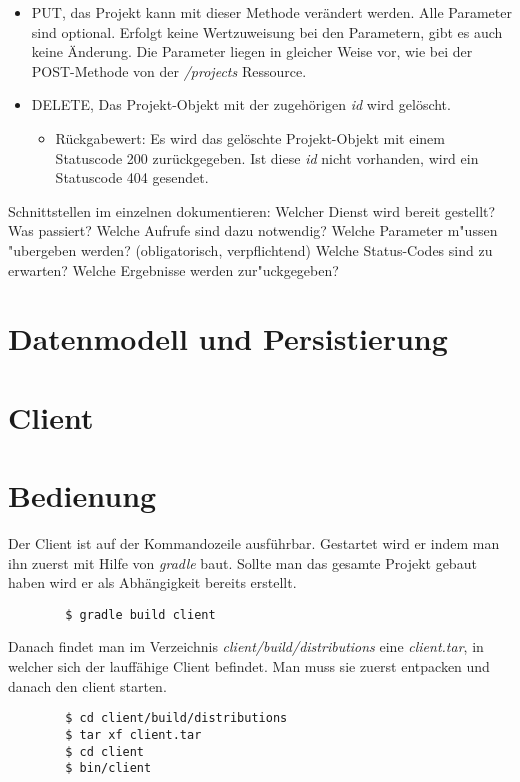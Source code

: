 \documentclass[12pt]{scrartcl}
\begin{document}
\begin{itemize}
\begin{itemize}
\begin{itemize}
				\end{itemize}
				\item PUT, das Projekt kann mit dieser Methode verändert werden. Alle Parameter sind optional. Erfolgt keine Wertzuweisung bei den Parametern, gibt es auch keine Änderung. Die Parameter liegen in gleicher Weise vor, wie bei der POST-Methode von der \emph{/projects} Ressource.
				\item DELETE, Das Projekt-Objekt mit der zugehörigen \emph{id} wird gelöscht.
				\begin{itemize}
					\item Rückgabewert: Es wird das gelöschte Projekt-Objekt mit einem Statuscode 200 zurückgegeben. Ist diese \emph{id} nicht vorhanden, wird ein Statuscode 404 gesendet.
				\end{itemize}
				

	\end{itemize}
\end{itemize}
 Schnittstellen im einzelnen dokumentieren:
 Welcher Dienst wird bereit gestellt? Was passiert?
 Welche Aufrufe sind dazu notwendig?
 Welche Parameter m"ussen "ubergeben werden? (obligatorisch, verpflichtend)
 Welche Status-Codes sind zu erwarten?
 Welche Ergebnisse werden zur"uckgegeben? 
\section{Datenmodell und Persistierung}
\section{Client}

\section{Bedienung}

	Der Client ist auf der Kommandozeile ausführbar. Gestartet wird er indem man ihn zuerst mit Hilfe von \emph{gradle} baut. Sollte man das gesamte Projekt gebaut haben wird er als Abhängigkeit bereits erstellt.
	\begin{verbatim}
		$ gradle build client
	\end{verbatim}
	
	Danach findet man im Verzeichnis \emph{client/build/distributions} eine \emph{client.tar}, in welcher sich der lauffähige Client befindet. Man muss sie zuerst entpacken und danach den client starten.
	
	\begin{verbatim}
		$ cd client/build/distributions
		$ tar xf client.tar
		$ cd client
		$ bin/client
	\end{verbatim}
	
\end{document}
